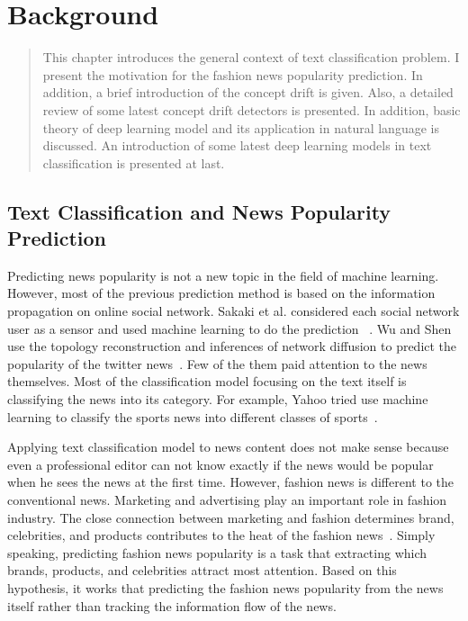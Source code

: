 \chapter{Background}
\label{background}

\begin{quote}
This chapter introduces the general context of text classification problem. I present the motivation for the fashion news popularity prediction. In addition, a brief introduction of the concept drift is given. Also, a detailed review of some latest concept drift detectors is presented. In addition, basic theory of deep learning model and its application in natural language is discussed. An introduction of some latest deep learning models in text classification is presented at last. 
\end{quote}

\section{Text Classification and News Popularity Prediction}

Predicting news popularity is not a new topic in the field of machine learning. However, most of the previous prediction method is based on the information propagation on online social network. Sakaki et al. considered each social network user as a sensor and used machine learning to do the prediction ~\cite{sakaki2010earthquake}. Wu and Shen use the topology reconstruction and inferences of network diffusion to predict the popularity of the twitter news~\cite{wu2015analyzing}. Few of the them paid attention to the news themselves. Most of the classification model focusing on the text itself is classifying the news into its category. For example, Yahoo tried use machine learning to classify the sports news into different classes of sports~\cite{selamat2002web}.

Applying text classification model to news content does not make sense because even a professional editor can not know exactly if the news would be popular when he sees the news at the first time. However, fashion news is different to the conventional news. Marketing and advertising play an important role in fashion industry. The close connection between marketing and fashion determines brand, celebrities, and products contributes to the heat of the fashion news~\cite{goworek2016relationship}. Simply speaking, predicting fashion news popularity is a task that extracting which brands, products, and celebrities attract most attention. Based on this hypothesis, it works that predicting the fashion news popularity from the news itself rather than tracking the information flow of the news. 

